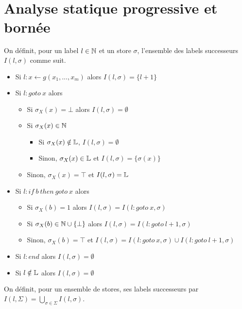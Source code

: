 \section{Analyse statique progressive et bornée}
On définit, pour un label $l\in\mathbb N$ et un store $\sigma$, l'ensemble des labels successeurs $I(l, \sigma)$ comme suit.
\begin{itemize}
 \item Si $l : x\leftarrow g(x_1, ..., x_m)$ alors $I(l, \sigma)=\{l+1\}$

 \item Si $l : goto\ x$ alors
 \begin{itemize}
  \item Si $\sigma_X(x)=\bot$ alors $I(l, \sigma)=\emptyset$
  \item Si $\sigma_X(x)\in\mathbb N$%
  \begin{itemize}
   \item Si $\sigma_X(x)\notin\mathbb L$, $I(l, \sigma)=\emptyset$
   \item Sinon, $\sigma_X(x)\in\mathbb L$ et $I(l, \sigma)=\{\sigma(x)\}$
  \end{itemize}
  \item Sinon, $\sigma_X(x)=\top$ et $I(l, \sigma)=\mathbb L$
 \end{itemize}
 \item Si $l : if \ b\ then\ goto\ x$ alors
 \begin{itemize}
  \item Si $\sigma_X(b)=1$ alors $I(l, \sigma)=I(l:goto\ x, \sigma)$
  \item Si $\sigma_X(b)\in\mathbb N\cup\{\bot\}$ alors $I(l, \sigma)=I(l:goto\ l+1, \sigma)$
  \item Sinon, $\sigma_X(b)=\top$ et $I(l, \sigma)=I(l:goto\ x, \sigma)\cup I(l:goto\ l+1, \sigma)$
 \end{itemize}
 \item Si $l : end$ alors $I(l, \sigma)=\emptyset$
 \item Si $l\notin\mathbb L$ alors $I(l, \sigma)=\emptyset$
\end{itemize}

 On définit, pour un ensemble de stores, ses labels successeurs par $I(l, \Sigma)=\bigcup_{\sigma\in\Sigma}I(l,\sigma)$.\\


